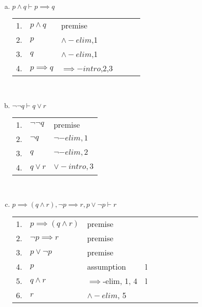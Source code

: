 \documentclass{article}
\begin{document}
\begin{enumerate}[\bf I.]
\begin{enumerate}[1.]
\begin{enumerate}[a.]
\begin{tabular}{l ll lll llll}
   \end{tabular} \\
 \item $p \land q \vdash p \implies q$ \\
   \begin{tabular}{l ll lll}
     1. & $p \land q$ & premise \\
     2. & $p$         & $\land-elim$,1\\
     3. & $q$         & $\land-elim$,1\\
     4. & $p \implies q$ & $\implies-intro$,2,3 \\
   \end{tabular} \\
 \item $\neg\neg q \vdash q \lor r$ \\
   \begin{tabular}{l ll}
    1. & $\neg\neg q$ & premise \\
    2. & $\neg q$ & $\neg-elim, 1$ \\
    3. & $q$ & $\neg-elim, 2$ \\
    4. & $q \lor r$ & $\lor-intro, 3$\\
   \end{tabular} \\
 \item $p \implies (q \land r), \neg p \implies r, p \lor \neg p \vdash r$ \\
   \begin{tabular}{l ll lll llll }
    1. & $p \implies (q \land r) $ & premise \\
    2. & $\neg p \implies r$       & premise \\
    3. & $p \lor \neg p$           & premise \\
    4. & $p$                       & assumption & l \\
    5. & $q \land r$               & $\implies$-elim, 1, 4 & l\\
    6. & $r$                       & $\land-elim$, 5 \\
   \end{tabular} \\
\end{enumerate}
\end{enumerate}

\vspace{12pt}


\end{enumerate}
\end{document}
